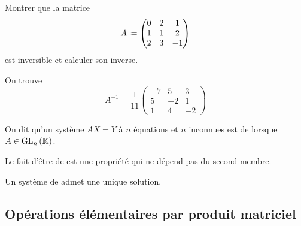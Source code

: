 \documentclass{magnolia}
\begin{document}
\begin{exoUnique}
\exo Montrer que la matrice
  \[A\coloneqq
  \begin{pmatrix}
  0 & 2 & 1\\
  1 & 1 & 2\\
  2 & 3 & -1
  \end{pmatrix}\]
  est inversible et calculer son inverse.
  \begin{sol}
  On trouve
  \[A^{-1}=\frac{1}{11}
    \begin{pmatrix}
    -7 & 5 & 3\\
    5 & -2 & 1\\
    1 & 4 & -2
    \end{pmatrix}\]
  \end{sol}  
\end{exoUnique}

\begin{definition}
  On dit qu'un système $AX=Y$ à $n$ équations et $n$ inconnues est de \emph{}
  lorsque $A\in{\rm GL}_{n}\left(\mathbb{K}\right)$.
  \end{definition}

\begin{remarqueUnique}
\remarque Le fait d'être de  est une propriété qui ne dépend pas du second
  membre.
\end{remarqueUnique}

\begin{proposition}
Un système de  admet une unique solution.
\end{proposition}

\subsection{Opérations élémentaires par produit matriciel}
\end{document}
